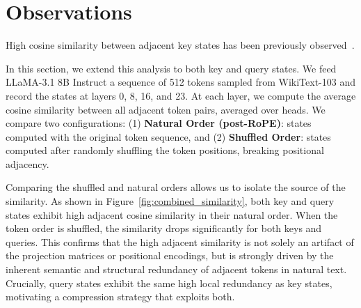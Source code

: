 \section{Observations}
\label{sec:observations}

High cosine similarity between adjacent key states has been previously observed~\cite{wang2024kvmerger}.

In this section, we extend this analysis to both key and query states. We feed LLaMA-3.1 8B Instruct a sequence of 512 tokens sampled from WikiText-103 and record the states at layers 0, 8, 16, and 23. At each layer, we compute the average cosine similarity between all adjacent token pairs, averaged over heads.
We compare two configurations: (1) \textbf{Natural Order (post-RoPE)}: states computed with the original token sequence, and (2) \textbf{Shuffled Order}: states computed after randomly shuffling the token positions, breaking positional adjacency.

Comparing the shuffled and natural orders allows us to isolate the source of the similarity. As shown in Figure~\ref{fig:combined_similarity}, both key and query states exhibit high adjacent cosine similarity in their natural order. When the token order is shuffled, the similarity drops significantly for both keys and queries. This confirms that the high adjacent similarity is not solely an artifact of the projection matrices or positional encodings, but is strongly driven by the inherent semantic and structural redundancy of adjacent tokens in natural text.
Crucially, query states exhibit the same high local redundancy as key states, motivating a compression strategy that exploits both.


